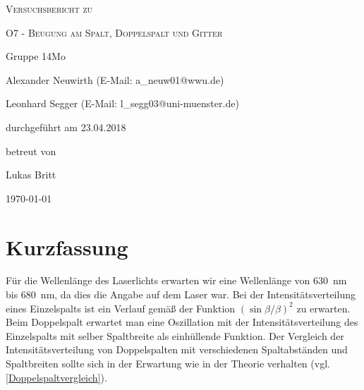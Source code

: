 \documentclass[
	a4paper,
	12pt,
	pagesize,
	ngerman
]{scrartcl}
\begin{document}
	
	\begin{titlepage}
		\centering
		{\scshape\LARGE Versuchsbericht zu \par}
		\vspace{1cm}
		{\scshape\huge O7 - Beugung am Spalt, Doppelspalt und Gitter \par} %
		\vspace{2.5cm}
		{\LARGE Gruppe 14Mo \par}
		\vspace{0.5cm}
		
		{\large Alexander Neuwirth (E-Mail: a\_neuw01@wwu.de) \par}
		{\large Leonhard Segger (E-Mail: l\_segg03@uni-muenster.de) \par}
		\vfill
		
		durchgeführt am 23.04.2018\par %
		betreut von\par
		{\large Lukas Britt} %
		
		\vfill
		
		{\large \today\par}
	\end{titlepage}
	\tableofcontents
	\newpage

	\section{Kurzfassung}
	
	Für die Wellenlänge des Laserlichts erwarten wir eine Wellenlänge von \SI{630}{\nano \meter} bis \SI{680}{\nano \meter}, da dies die Angabe auf dem Laser war.
	Bei der Intensitätsverteilung eines Einzelspalts ist ein Verlauf gemäß der Funktion $ \left( \sin \beta / \beta \right) ^2 $ zu erwarten. %
	Beim Doppelspalt erwartet man eine Oszillation mit der Intensitätsverteilung des Einzelspalts mit selber Spaltbreite als einhüllende Funktion.
	Der Vergleich der Intensitätsverteilung von Doppelspalten mit verschiedenen Spaltabständen und Spaltbreiten sollte sich in der Erwartung wie in der Theorie verhalten (vgl. \cref{Doppelspaltvergleich}). %
	
	
\end{document}
